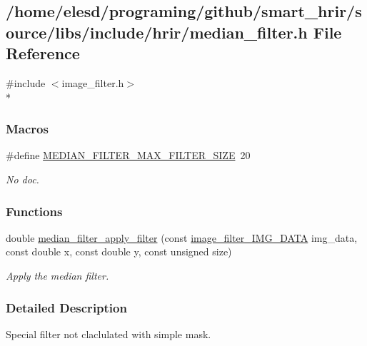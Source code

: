 \hypertarget{a00014}{\subsection{/home/elesd/programing/github/smart\-\_\-hrir/source/libs/include/hrir/median\-\_\-filter.h File Reference}
\label{a00014}
}
{\ttfamily \#include $<$image\-\_\-filter.\-h$>$}\\*
\subsubsection*{Macros}
\begin{DoxyCompactItemize}
\item 
\hypertarget{a00014_ace98891b151f770abd5067a5a7b2e0da}{\#define \hyperlink{a00014_ace98891b151f770abd5067a5a7b2e0da}{M\-E\-D\-I\-A\-N\-\_\-\-F\-I\-L\-T\-E\-R\-\_\-\-M\-A\-X\-\_\-\-F\-I\-L\-T\-E\-R\-\_\-\-S\-I\-Z\-E}~20}\label{a00014_ace98891b151f770abd5067a5a7b2e0da}

\begin{DoxyCompactList}\small\item\em No doc. \end{DoxyCompactList}\end{DoxyCompactItemize}
\subsubsection*{Functions}
\begin{DoxyCompactItemize}
\item 
double \hyperlink{a00014_ab42b1bfcdb2322e7c78deb898822bc57}{median\-\_\-filter\-\_\-apply\-\_\-filter} (const \hyperlink{a00012_afbdd6cd26209a0a7c753b951a39160e3}{image\-\_\-filter\-\_\-\-I\-M\-G\-\_\-\-D\-A\-T\-A} img\-\_\-data, const double x, const double y, const unsigned size)
\begin{DoxyCompactList}\small\item\em Apply the median filter. \end{DoxyCompactList}\end{DoxyCompactItemize}


\subsubsection{Detailed Description}
Special filter not claclulated with simple mask. 

